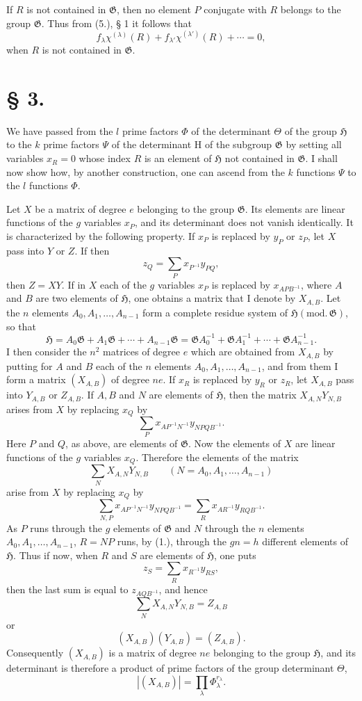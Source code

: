 \documentclass[11pt]{article}
\newcommand{\Hgr}{\mathfrak{H}}
\newcommand{\Ggr}{\mathfrak{G}}
\begin{document}
If $R$ is not contained in $\Ggr$, then no element $P$ conjugate with $R$ belongs to the group $\Ggr$. Thus from (5.), § 1 it follows that
\[
\tag{5.}
  f_\lambda\chi^{(\lambda)}(R)+f_{\lambda'}\chi^{(\lambda')}(R)+\cdots=0,
\]
when $R$ is not contained in $\Ggr$.

\section*{§ 3.}

We have passed from the $l$ prime factors $\Phi$ of the determinant $\Theta$ of the group $\Hgr$ to the $k$ prime factors $\Psi$ of the determinant $\mathrm H$ of the subgroup $\Ggr$ by setting all variables $x_R=0$ whose index $R$ is an element of $\Hgr$ not contained in $\Ggr$. I shall now show how, by another construction, one can ascend from the $k$ functions $\Psi$ to the $l$ functions $\Phi$.

Let $X$ be a matrix of degree $e$ belonging to the group $\Ggr$. Its elements are linear functions of the $g$ variables $x_P$, and its determinant does not vanish identically. It is characterized by the following property. If $x_P$ is replaced by $y_P$ or $z_P$, let $X$ pass into $Y$ or $Z$. If then
\[
  z_Q=\sum_P x_{P^{-1}}y_{PQ},
\]
then $Z=XY$. If in $X$ each of the $g$ variables $x_P$ is replaced by $x_{APB^{-1}}$, where $A$ and $B$ are two elements of $\Hgr$, one obtains a matrix that I denote by $X_{A,B}$. Let the $n$ elements $A_0,A_1,\ldots,A_{n-1}$ form a complete residue system of $\Hgr(\mathrm{mod.}\,\Ggr)$, so that
\[
\tag{1.}
  \Hgr=A_0\Ggr+A_1\Ggr+\cdots+A_{n-1}\Ggr
  =
  \Ggr A_0^{-1}+\Ggr A_1^{-1}+\cdots+\Ggr A_{n-1}^{-1}.
\]
I then consider the $n^2$ matrices of degree $e$ which are obtained from $X_{A,B}$ by putting for $A$ and $B$ each of the $n$ elements $A_0,A_1,\ldots,A_{n-1}$, and from them I form a matrix $(X_{A,B})$ of degree $ne$. If $x_R$ is replaced by $y_R$ or $z_R$, let $X_{A,B}$ pass into $Y_{A,B}$ or $Z_{A,B}$. If $A,B$ and $N$ are elements of $\Hgr$, then the matrix $X_{A,N}Y_{N,B}$ arises from $X$ by replacing $x_Q$ by
\[
  \sum_P x_{AP^{-1}N^{-1}}y_{NPQB^{-1}}.
\]
Here $P$ and $Q$, as above, are elements of $\Ggr$. Now the elements of $X$ are linear functions of the $g$ variables $x_Q$. Therefore the elements of the matrix
\[
  \sum_N X_{A,N}Y_{N,B}
  \qquad(N=A_0,A_1,\ldots,A_{n-1})
\]
arise from $X$ by replacing $x_Q$ by
\[
  \sum_{N,P}x_{AP^{-1}N^{-1}}y_{NPQB^{-1}}
  =
  \sum_R x_{AR^{-1}}y_{RQB^{-1}}.
\]
As $P$ runs through the $g$ elements of $\Ggr$ and $N$ through the $n$ elements $A_0,A_1,\ldots,A_{n-1}$, $R=NP$ runs, by (1.), through the $gn=h$ different elements of $\Hgr$. Thus if now, when $R$ and $S$ are elements of $\Hgr$, one puts
\[
  z_S=\sum_R x_{R^{-1}}y_{RS},
\]
then the last sum is equal to $z_{AQB^{-1}}$, and hence
\[
  \sum_N X_{A,N}Y_{N,B}=Z_{A,B}
\]
or
\[
  (X_{A,B})(Y_{A,B})=(Z_{A,B}).
\]
Consequently $(X_{A,B})$ is a matrix of degree $ne$ belonging to the group $\Hgr$, and its determinant is therefore a product of prime factors of the group determinant $\Theta$,
\[
\tag{2.}
  |(X_{A,B})|=\prod_\lambda \Phi_\lambda^{r_\lambda}.
\]
\end{document}
